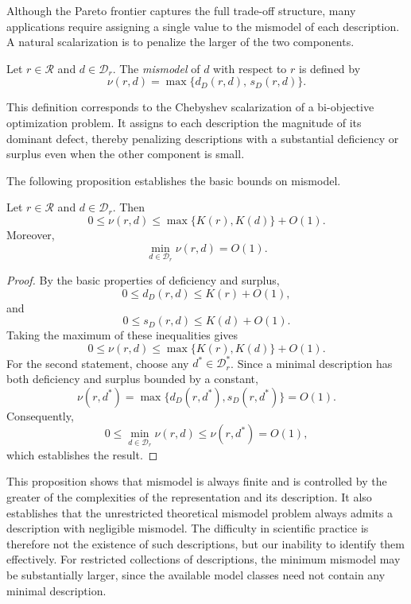 Although the Pareto frontier captures the full trade-off structure, many applications require assigning a single value to the mismodel of each description. A natural scalarization is to penalize the larger of the two components.

\begin{definition}
\label{def:scalar_mismodel}
Let $r\in\mathcal R$ and $d\in\mathcal D_r$. The \emph{mismodel} of $d$ with respect to $r$ is defined by
\[
\nu(r,d) = \max\bigl\{d_D(r,d),\,s_D(r,d)\bigr\}.
\]
\end{definition}

This definition corresponds to the Chebyshev scalarization of a bi-objective optimization problem. It assigns to each description the magnitude of its dominant defect, thereby penalizing descriptions with a substantial deficiency or surplus even when the other component is small.

The following proposition establishes the basic bounds on mismodel.

\begin{proposition}
\label{prop:mismodel_bounds}
Let $r\in\mathcal R$ and $d\in\mathcal D_r$. Then
\[
0\le\nu(r,d) \le \max\{K(r),K(d)\}+O(1).
\]
Moreover,
\[
\min_{d\in\mathcal D_r}\nu(r,d)=O(1).
\]
\end{proposition}
\begin{proof}
By the basic properties of deficiency and surplus,
\[
0 \le d_D(r,d)\le K(r)+O(1),
\]
and
\[
0 \le s_D(r,d)\le K(d)+O(1).
\]
Taking the maximum of these inequalities gives
\[
0\le\nu(r,d) \le \max\{K(r),K(d)\}+O(1).
\]
For the second statement, choose any $d^\ast\in\mathcal D_r^\ast$. Since a minimal description has both deficiency and surplus bounded by a constant,
\[
\nu(r,d^\ast) = \max\{d_D(r,d^\ast),s_D(r,d^\ast)\} = O(1).
\]
Consequently,
\[
0 \le \min_{d\in\mathcal D_r}\nu(r,d) \le \nu(r,d^\ast) = O(1),
\]
which establishes the result.
\end{proof}

This proposition shows that mismodel is always finite and is controlled by the greater of the complexities of the representation and its description. It also establishes that the unrestricted theoretical mismodel problem always admits a description with negligible mismodel. The difficulty in scientific practice is therefore not the existence of such descriptions, but our inability to identify them effectively. For restricted collections of descriptions, the minimum mismodel may be substantially larger, since the available model classes need not contain any minimal description.


